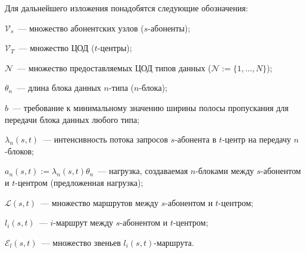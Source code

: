 \begin{multicols}{2}
  Для дальнейшего изложения понадобятся следующие обозначения:
\begin{description}
\item $\mathcal{V}_s$~--- множество абонентских узлов ($s$-або\-нен\-ты);
\item $\mathcal{V}_T$~--- множество ЦОД ($t$-цент\-ры);
\item $\mathcal{N}$~--- множество предоставляемых ЦОД типов данных ($\mathcal{N}:=\{1,\ldots ,N\}$);
\item $\theta_n$~--- длина блока данных $n$-ти\-па ($n$-бло\-ка);
\item $b$~--- требование к минимальному значению ширины полосы 
пропускания для передачи блока данных любого типа;
\item $\lambda_n (s,t)$~--- интенсивность потока запросов $s$-або\-нен\-та в 
$t$-центр на передачу $n$-бло\-ков;
\item $a_n(s,t):= \lambda_n(s,t)\theta_n$~--- нагрузка, создаваемая $n$-блоками 
между $s$-або\-нен\-том и $t$-цент\-ром (предложенная нагрузка);
\item $\mathcal{L} (s,t)$~--- множество маршрутов между $s$-або\-нен\-том и 
$t$-цент\-ром;
\item $l_i(s,t)$~--- $i$-маршрут между $s$-або\-нен\-том и $t$-цент\-ром;
\item ${\mathcal E}_l (s,t)$~--- множество звеньев $l_i(s,t)$-марш\-ру\-та.
\end{description}
\pagebreak

\end{multicols}

\begin{figure} %
\vspace*{1pt}
\begin{center}
\mbox{%
\epsfxsize=154.841mm
}
\end{center}
\vspace*{-9pt}
\end{figure}

